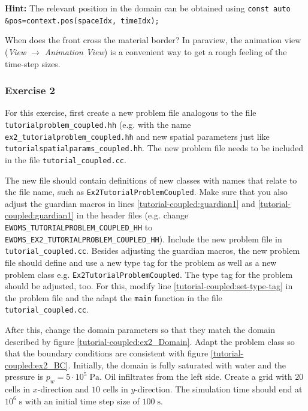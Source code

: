 \begin{enumerate}
\textbf{Hint:} The relevant position in the domain can be obtained using
\texttt{const auto \&pos=context.pos(spaceIdx, timeIdx);}

When does the front cross the material border? In paraview, the
animation view (\textit{View} $\rightarrow$ \textit{Animation View})
is a convenient way to get a rough feeling of the time-step sizes.
\end{enumerate}

\subsubsection{Exercise 2}

For this exercise, first create a new problem file analogous to the
file \texttt{tutorialproblem\_coupled.hh} (e.g. with the name
\texttt{ex2\_tutorialproblem\_coupled.hh} and new spatial parameters
just like \texttt{tutorialspatialparams\_coupled.hh}. The new problem
file needs to be included in the file \texttt{tutorial\_coupled.cc}.

The new file should contain definitions of new classes with names that
relate to the file name, such as
\texttt{Ex2TutorialProblemCoupled}. Make sure that you also adjust the
guardian macros in lines \ref{tutorial-coupled:guardian1} and
\ref{tutorial-coupled:guardian1} in the header files (e.g. change
\mbox{\texttt{EWOMS\_TUTORIALPROBLEM\_COUPLED\_HH}} to
\mbox{\texttt{EWOMS\_EX2\_TUTORIALPROBLEM\_COUPLED\_HH}}). Include the
new problem file in \texttt{tutorial\_coupled.cc}.  Besides adjusting
the guardian macros, the new problem file should define and use a new
type tag for the problem as well as a new problem class
e.g. \mbox{\texttt{Ex2TutorialProblemCoupled}}. The type tag for the
problem should be adjusted, too. For this, modify line
\ref{tutorial-coupled:set-type-tag} in the problem file and the adapt
the \texttt{main} function in the file \texttt{tutorial\_coupled.cc}.

After this, change the domain parameters so that they match the domain
described by figure \ref{tutorial-coupled:ex2_Domain}. Adapt the
problem class so that the boundary conditions are consistent with
figure \ref{tutorial-coupled:ex2_BC}. Initially, the domain is fully
saturated with water and the pressure is $p_w = 5\cdot
10^5\;\text{Pa}$. Oil infiltrates from the left side. Create a grid
with $20$ cells in $x$-direction and $10$ cells in $y$-direction. The
simulation time should end at $10^6\;\text{s}$ with an initial time
step size of $100\;\text{s}$.

